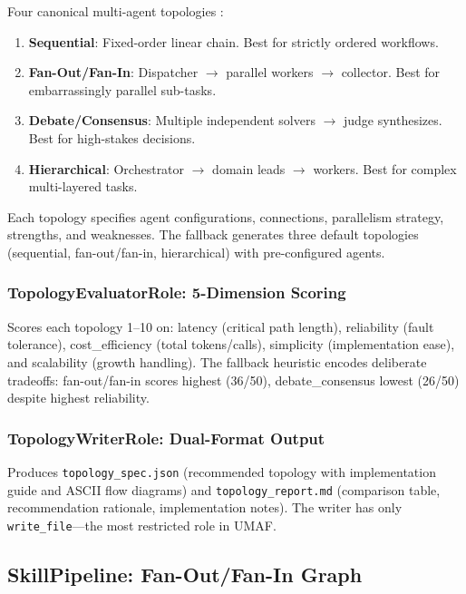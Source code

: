 Four canonical multi-agent topologies \cite{gdesigner,argdesigner,mass}:
\begin{enumerate}
    \item \textbf{Sequential}: Fixed-order linear chain. Best for strictly ordered workflows.
    \item \textbf{Fan-Out/Fan-In}: Dispatcher $\rightarrow$ parallel workers $\rightarrow$ collector. Best for embarrassingly parallel sub-tasks.
    \item \textbf{Debate/Consensus}: Multiple independent solvers $\rightarrow$ judge synthesizes. Best for high-stakes decisions.
    \item \textbf{Hierarchical}: Orchestrator $\rightarrow$ domain leads $\rightarrow$ workers. Best for complex multi-layered tasks.
\end{enumerate}
Each topology specifies agent configurations, connections, parallelism strategy, strengths, and weaknesses. The fallback generates three default topologies (sequential, fan-out/fan-in, hierarchical) with pre-configured agents.

\subsubsection{TopologyEvaluatorRole: 5-Dimension Scoring}

Scores each topology 1--10 on: latency (critical path length), reliability (fault tolerance), cost\_efficiency (total tokens/calls), simplicity (implementation ease), and scalability (growth handling). The fallback heuristic encodes deliberate tradeoffs: fan-out/fan-in scores highest (36/50), debate\_consensus lowest (26/50) despite highest reliability.

\subsubsection{TopologyWriterRole: Dual-Format Output}

Produces \texttt{topology\_spec.json} (recommended topology with implementation guide and ASCII flow diagrams) and \texttt{topology\_report.md} (comparison table, recommendation rationale, implementation notes). The writer has only \texttt{write\_file}---the most restricted role in UMAF.

\subsection{SkillPipeline: Fan-Out/Fan-In Graph}

